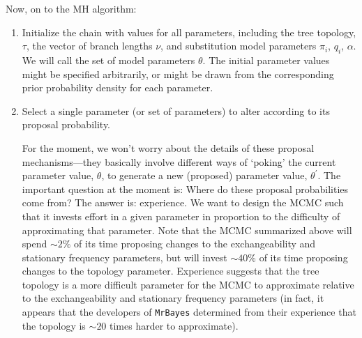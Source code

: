 Now, on to the MH algorithm:

\begin{enumerate}
\item{Initialize the chain with values for all parameters, including the tree topology, $\tau$, the vector of branch lengths $\nu$, and substitution model parameters $\pi_i$, $q_i$, $\alpha$. 
We will call the set of model parameters $\theta$. The initial parameter values might be specified arbitrarily, or might be drawn from the corresponding prior probability density for each parameter.}

\item{Select a single parameter (or set of parameters) to alter according to its proposal probability. 
%
%

For the moment, we won't worry about the details of these proposal mechanisms---they basically involve different ways of `poking' the current parameter value, $\theta$, to generate a new (proposed) parameter value, $\theta ^{\prime}$. 
The important question at the moment is: Where do these proposal probabilities come from? 
The answer is: experience. 
We want to design the MCMC such that it invests effort in a given parameter in proportion to the difficulty of approximating that parameter. 
Note that the MCMC summarized above will spend $\sim 2\%$ of its time proposing changes to the exchangeability and stationary frequency parameters, but will invest $\sim 40\%$ of its time proposing changes to the topology parameter. 
Experience suggests that the tree topology is a more difficult parameter for the MCMC to approximate relative to the exchangeability and stationary frequency parameters (in fact, it appears that the developers of \verb!MrBayes! determined from their experience that the topology is $\sim 20$ times harder to approximate).}


\end{enumerate}
